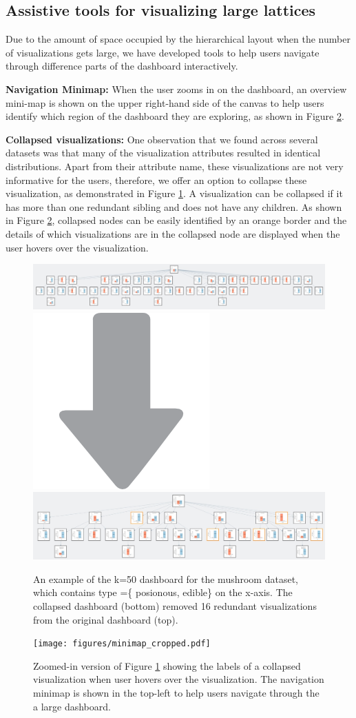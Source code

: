 \subsection{Assistive tools for visualizing large lattices}
Due to the amount of space occupied by the hierarchical layout when the number of visualizations gets large, we have developed tools to help users navigate through difference parts of the dashboard interactively. 
\par \textbf{Navigation Minimap:}  When the user zooms in on the dashboard, an overview mini-map is shown on the upper right-hand side of the canvas to help users identify which region of the dashboard they are exploring, as shown in Figure \ref{hover_minimap}. 
\par \textbf{Collapsed visualizations:} 
One observation that we found across several datasets was that many of the visualization attributes resulted in identical distributions. Apart from their attribute name, these visualizations are not very informative for the users, therefore, we offer an option to collapse these visualization, as demonstrated in Figure \ref{collapse_demo}. A visualization can be collapsed if it has more than one redundant sibling and does not have any children. As shown in Figure \ref{hover_minimap}, collapsed nodes can be easily identified by an orange border and the details of which visualizations are in the collapsed node are displayed when the user hovers over the visualization.
\begin{figure}[ht!]
\label{collapse_demo}
\centering
\includegraphics[width=\linewidth]{figures/k50_original.jpeg}
\includegraphics[width=0.05\linewidth]{figures/arrow_down.png}
\includegraphics[width=\linewidth]{figures/k50_collapsed.jpeg}
\caption{An example of the k=50 dashboard for the mushroom dataset, which contains type =\{ posionous, edible\} on the x-axis. The collapsed dashboard (bottom) removed 16 redundant visualizations from the original dashboard (top).}
\end{figure}

\begin{figure}[ht!]
\label{hover_minimap}
\centering
\texttt{[image: figures/minimap\_cropped.pdf]}
\caption{Zoomed-in version of Figure \ref{collapse_demo} showing the labels of a collapsed visualization when user hovers over the visualization. The navigation minimap is shown in the top-left to help users navigate through the a large dashboard.}
\end{figure}

